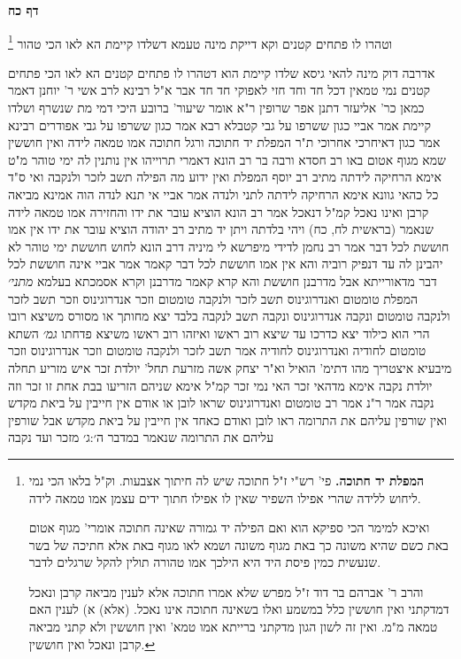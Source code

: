 \documentclass[12pt, openany]{book}
\newcommand{\sethebfont}{
\fontsize{10.5pt}{21.0pt} \selectfont
}
\newcommand{\twocol}[1]{
	{\sethebfont \begin{multicols}{2}
			#1
	\end{multicols}}	
}
\newcommand{\sectname}{}
\newcommand{\newsection}[1]{
	\addcontentsline{toc}{section}{#1}
	\renewcommand{\sectname}{#1}	
	\vspace{-\baselineskip}
	\begin{center}
		\textbf{%
\fontsize{16pt}{16pt}\selectfont
			#1}
	\end{center}
	\vspace{-\baselineskip}
	\nopagebreak
}
\newcommand{\footnotecomment}[1]{\footnote{#1}}
\newcommand{\commenta}[1]{\footnotecomment{#1}}
\begin{document}
\newsection{דף כח}
\twocol{וטהרו לו פתחים קטנים  וקא דייקת מינה  טעמא דשלדו קיימת הא לאו הכי טהור 
\commenta{\textbf{המפלת יד חתוכה.}  פי' רש"י ז"ל חתוכה שיש לה חיתוך אצבעות. וק"ל בלאו הכי נמי ליחוש ללידה שהרי אפילו השפיר שאין לו אפילו חתוך ידים עצמן אמו טמאה לידה.\par  ואיכא למימר הכי ספיקא הוא ואם הפילה יד גמורה שאינה חתוכה אומרי' מגוף אטום באת כשם שהיא משונה כך באת מגוף משונה ושמא לאו מגוף באת אלא חתיכה של בשר שנעשית כמין פיסת היד היא הילכך אמו טהורה תולין להקל שרגלים לדבר.\par והרב ר' אברהם בר דוד ז"ל מפרש שלא אמרו חתוכה אלא לענין מביאה קרבן ונאכל דמדקתני ואין חוששין כלל במשמע ואלו בשאינה חתוכה אינו נאכל. (אלא) א) לענין האם טמאה מ"מ. ואין זה לשון הגון מדקתני ברייתא אמו טמא' ואין חוששין ולא קתני מביאה קרבן ונאכל ואין חוששין. }

אדרבה דוק מינה להאי גיסא  שלדו קיימת הוא דטהרו לו פתחים קטנים הא לאו הכי פתחים קטנים נמי טמאין דכל חד וחד חזי לאפוקי חד חד אבר 
א"ל רבינא לרב אשי  ר' יוחנן דאמר כמאן כר' אליעזר  דתנן אפר שרופין ר"א אומר  שיעור' ברובע 
היכי דמי מת שנשרף ושלדו קיימת  אמר אביי  כגון ששרפו על גבי קטבלא  רבא אמר  כגון ששרפו על גבי אפודרים  רבינא אמר  כגון דאיחרכי אחרוכי 
ת"ר  המפלת יד חתוכה ורגל חתוכה אמו טמאה לידה ואין חוששין שמא מגוף אטום באו 
רב חסדא ורבה בר רב הונא דאמרי תרוייהו  אין נותנין לה ימי טוהר מ"ט אימא הרחיקה לידתה 
מתיב רב יוסף  המפלת ואין ידוע מה הפילה תשב לזכר ולנקבה  ואי ס"ד כל כהאי גוונא אימא הרחיקה לידתה לתני ולנדה 
אמר אביי  אי תנא לנדה הוה אמינא מביאה קרבן ואינו נאכל קמ"ל דנאכל 
אמר רב הונא  הוציא עובר את ידו והחזירה אמו טמאה לידה  שנאמר  (בראשית לח, כח) ויהי בלדתה ויתן יד 
מתיב רב יהודה  הוציא עובר את ידו אין אמו חוששת לכל דבר  אמר רב נחמן  לדידי מיפרשא לי מיניה דרב הונא לחוש חוששת ימי טוהר לא יהבינן לה עד דנפיק רוביה 
והא אין אמו חוששת לכל דבר קאמר  אמר אביי  אינה חוששת לכל דבר מדאורייתא אבל מדרבנן חוששת  והא קרא קאמר  מדרבנן וקרא אסמכתא בעלמא
{\large\emph{מתני׳}} המפלת טומטום ואנדרוגינוס תשב לזכר ולנקבה
טומטום וזכר אנדרוגינוס וזכר תשב לזכר ולנקבה  טומטום ונקבה אנדרוגינוס ונקבה תשב לנקבה בלבד 
יצא מחותך או מסורס משיצא רובו הרי הוא כילוד  יצא כדרכו עד שיצא רוב ראשו  ואיזהו רוב ראשו משיצא פדחתו
{\large\emph{גמ׳}} השתא טומטום לחודיה ואנדרוגינוס לחודיה אמר תשב לזכר ולנקבה טומטום וזכר אנדרוגינוס וזכר מיבעיא
איצטריך מהו דתימ' הואיל וא"ר יצחק  אשה מזרעת תחל' יולדת זכר איש מזריע תחלה יולדת נקבה אימא  מדהאי זכר האי נמי זכר קמ"ל אימא שניהם הזריעו בבת אחת זו זכר וזה נקבה 
אמר ר"נ אמר רב  טומטום ואנדרוגינוס שראו לובן או אודם אין חייבין על ביאת מקדש ואין שורפין עליהם את התרומה 
ראו לובן ואודם כאחד אין חייבין על ביאת מקדש אבל שורפין עליהם את התרומה שנאמר  {במדבר ה׳:ג׳ } מזכר ועד נקבה
}
\end{document}

